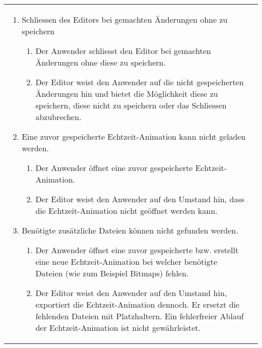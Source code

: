 \begin{table}[H]
\begin{tabular}{p{}p{}}
\begin{enumerate}[label= (\alph*)]
                \item{Schliessen des Editors bei gemachten Änderungen ohne zu
                        speichern
                    \begin{enumerate}[label= (\roman*)]
                        \item{Der Anwender schliesst den Editor bei gemachten
                                Änderungen ohne diese zu speichern.}
                        \item{Der Editor weist den Anwender auf die
                                nicht gespeicherten Änderungen hin und bietet
                                die Möglichkeit diese zu speichern, diese nicht
                                zu speichern oder das Schliessen abzubrechen.}
                    \end{enumerate}
                }
                \item{Eine zuvor gespeicherte Echtzeit-Animation kann nicht
                        geladen werden.
                    \begin{enumerate}[label= (\roman*)]
                        \item{Der Anwender öffnet eine zuvor gespeicherte
                                Echtzeit-Animation.}
                        \item{Der Editor weist den Anwender auf den Umstand
                                hin, dass die Echtzeit-Animation nicht geöffnet
                                werden kann.}
                    \end{enumerate}
                }
                \item{Benötigte zusätzliche Dateien können nicht gefunden
                        werden.
                    \begin{enumerate}[label= (\roman*)]
                        \item{Der Anwender öffnet eine zuvor gespeicherte bzw.
                                erstellt eine neue Echtzeit-Animation bei
                                welcher benötigte Dateien (wie zum Beispiel
                                Bitmaps) fehlen.}
                        \item{Der Editor weist den Anwender auf den Umstand
                                hin, exportiert die Echtzeit-Animation dennoch. Er
                                ersetzt die fehlenden Dateien mit
                                Platzhaltern. Ein fehlerfreier Ablauf der
                                Echtzeit-Animation ist nicht gewährleistet.}

\end{enumerate}}
\end{enumerate}
\end{tabular}
\end{table}
